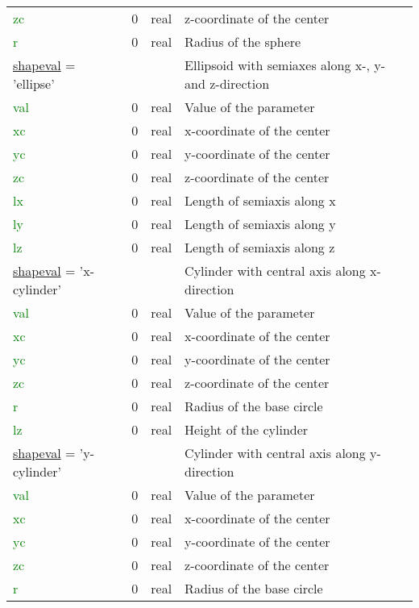 \documentclass[12pt,twoside]{article}
\begin{document}
\begin{longtable}{|p{4.8cm}|p{2cm}|p{2cm}|p{5.4cm}|}
\textcolor{green}{zc} & 0 & real & z-coordinate of the center\\
\textcolor{green}{r} & 0 & real & Radius of the sphere\\
\hdashline
\uline{shapeval} = 'ellipse' & & & Ellipsoid with semiaxes along x-, y- and z-direction\vspace{0.25cm}\\
\textcolor{green}{val} & 0 & real & Value of the parameter\\
\textcolor{green}{xc} & 0 & real & x-coordinate of the center\\
\textcolor{green}{yc} & 0 & real & y-coordinate of the center\\
\textcolor{green}{zc} & 0 & real & z-coordinate of the center\\
\textcolor{green}{lx} & 0 & real & Length of semiaxis along x\\
\textcolor{green}{ly} & 0 & real & Length of semiaxis along y\\
\textcolor{green}{lz} & 0 & real & Length of semiaxis along z\\
\hdashline
\uline{shapeval} = 'x-cylinder' & & & Cylinder with central axis along x-direction\vspace{0.25cm}\\
\textcolor{green}{val} & 0 & real & Value of the parameter\\
\textcolor{green}{xc} & 0 & real & x-coordinate of the center\\
\textcolor{green}{yc} & 0 & real & y-coordinate of the center\\
\textcolor{green}{zc} & 0 & real & z-coordinate of the center\\
\textcolor{green}{r} & 0 & real & Radius of the base circle\\
\textcolor{green}{lz} & 0 & real & Height of the cylinder\\
\hdashline
\uline{shapeval} = 'y-cylinder' & & & Cylinder with central axis along y-direction\vspace{0.25cm}\\
\textcolor{green}{val} & 0 & real & Value of the parameter\\
\textcolor{green}{xc} & 0 & real & x-coordinate of the center\\
\textcolor{green}{yc} & 0 & real & y-coordinate of the center\\
\textcolor{green}{zc} & 0 & real & z-coordinate of the center\\
\textcolor{green}{r} & 0 & real & Radius of the base circle\\

\end{longtable}
\end{document}
